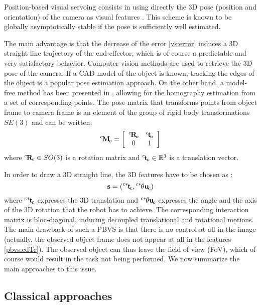 \documentclass[letterpaper, 10 pt, conference]{IEEEtran}  %
\begin{document}
\def\t{\mathbf{t}}
\def\thu{\theta\mathbf{u}}
Position-based visual servoing consists in using directly the 3D pose (position and orientation)  of the camera as visual features \cite{wilson2002relative}. This scheme is known to be globally asymptotically stable if the pose is sufficiently well estimated.

The main advantage is that the decrease of the error \eqref{vs:error} induces a 3D straight line trajectory of the end-effector, which is of course a predictable and very satisfactory behavior.
Computer vision methods are used to retrieve the 3D pose of the camera. If a CAD model of the object is known, tracking the edges of the object \cite{Comport05b, drummond2002real} is a popular pose estimation approach. 
On the other hand, a model-free method has been presented in \cite{1999_itra_malis}, allowing for the homography estimation from a set of corresponding points.
The pose matrix that transforms points from object frame to camera frame is an element of the group of rigid body transformations $SE(3)$ and can be written:
\begin{equation}\label{pbvs:cMo}
\Hom{c}{o} = \left[\begin{array}{cc} \Rot{c}{o} & \Transl{c}{o} \\ 0 & 1 \end{array}\right]
\end{equation}where $\Rot{c}{o}\in SO(3)$ is a rotation matrix and $\Transl{c}{o}\inR{3}\empty$ is a translation vector.

In order to draw a 3D straight line, the 3D features have to be chosen as :
\begin{equation}\label{pbvs:cdTc}
\s=(\Transl{c*}{c},\ThetaU{c*}{c})
\end{equation}where $\Transl{c*}{c}$ expresses the 3D translation and $\ThetaU{c*}{c}$ expresses the angle and the axis of the 3D rotation that the robot has to achieve. The corresponding interaction matrix is bloc-diagonal, inducing decoupled translational and rotational motions.
The main drawback of such a PBVS is that there is no control at all in the image (actually, the observed object frame does not appear at all in the features \eqref{pbvs:cdTc}). The observed object can thus leave the field of view (FoV), which of course would result in the task not being performed. We now summarize the main approaches to this issue.

\subsection{Classical approaches}
\end{document}
